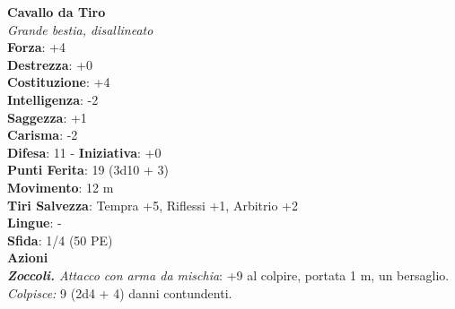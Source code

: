 \begin{multicols}{2}
\medskip\textbf{Cavallo da Tiro}\\
\emph{Grande bestia, disallineato}\\
\textbf{Forza}: +4\\
\textbf{Destrezza}: +0\\
\textbf{Costituzione}: +4\\
\textbf{Intelligenza}: -2\\
\textbf{Saggezza}: +1\\
\textbf{Carisma}: -2\\
\textbf{Difesa}: 11 - \textbf{Iniziativa}: +0\\
\textbf{Punti Ferita}: 19 (3d10 + 3)\\
\textbf{Movimento}: 12 m\\
\textbf{Tiri Salvezza}:  Tempra +5, Riflessi +1, Arbitrio +2 \\
\textbf{Lingue}: -\\
\textbf{Sfida}: 1/4 (50 PE)\smallskip\\
\smallskip\textbf{Azioni}\\
\emph{\textbf{Zoccoli.} Attacco con arma da mischia}: +9 al colpire, portata 1 m, un bersaglio.\\
\emph{Colpisce:} 9 (2d4 + 4) danni contundenti.\\


\end{multicols}
